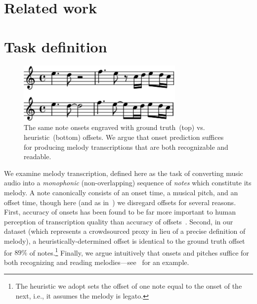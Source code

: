 \documentclass{article}
\begin{document}
\section{Related work}



\section{Task definition}

\begin{figure}
    \centering
    \includegraphics[width=8.1cm]{figs/heuristic_offsets.pdf}
    \caption{
The same note onsets engraved with ground truth~(top) vs. heuristic~(bottom) offsets. 
We argue that onset prediction suffices for producing melody transcriptions that are both recognizable and readable. 
}
 \label{fig:heuristic_offsets}
\end{figure}

We examine melody transcription, defined here as the task of converting music audio into a \emph{monophonic} (non-overlapping) sequence of \emph{notes} which constitute its melody. 
A note canonically consists of an onset time, a musical pitch, and an offset time, though here (and as in~\cite{laaksonen2014automatic}) we disregard offsets for several reasons. 
First, accuracy of onsets has been found to be far more important to human perception of transcription quality than accuracy of offsets~\cite{ycart2020investigating}. 
Second, in our dataset (which represents a crowdsourced proxy in lieu of a precise definition of melody), a heuristically-determined offset is identical to the ground truth offset for $89\%$ of notes.\footnote{The heuristic we adopt sets the offset of one note equal to the onset of the next, i.e., it assumes the melody is legato.}
Finally, we argue intuitively that onsets and pitches suffice for both recognizing and reading melodies---see~ for an example. 
\end{document}
